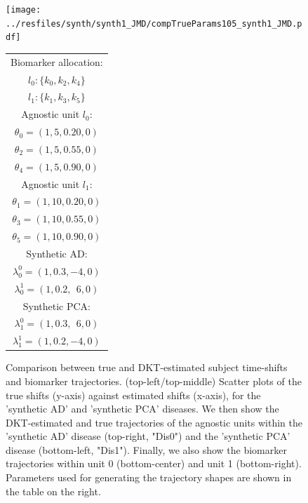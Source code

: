 \documentclass{llncs}
\begin{document}
\begin{figure}[htp]
\texttt{[image: ../resfiles/synth/synth1\_JMD/compTrueParams105\_synth1\_JMD.pdf]}
\begin{flushright}
\vspace{-16.0em}
\fontsize{5}{8.0}\selectfont
 \begin{tabular}{c}
 Biomarker allocation:\\
 $l_0:\{k_0, k_2, k_4\}$ \\
 $l_1: \{k_1, k_3, k_5\}$ \\
\hline
Agnostic unit $l_0$:\\
$\theta_0 = (1,5,0.20,0)$\\
$\theta_2 = (1,5,0.55,0)$\\
$\theta_4 = (1,5,0.90,0)$ \\
\hline
Agnostic unit $l_1$:\\
$\theta_1 = (1,10,0.20,0)$\\
$\theta_3 = (1,10,0.55,0)$\\
$\theta_5 = (1,10,0.90,0)$ \\
\hline  
Synthetic AD:\\
$\lambda_0^0 = (1, 0.3, -4, 0)$\\
$\lambda_0^1 = (1, 0.2,\ \ 6, 0)$ \\
\hline
Synthetic PCA:\\ 
$\lambda_1^0 = (1, 0.3,\ \ 6, 0)$\\
$\lambda_1^1 = (1, 0.2, -4, 0)$\\
\end{tabular}
\end{flushright}
\vspace{-1em}
\caption[DKT Simulation Results - Comparison between true and DKT-estimated biomarker trajectories and subject time-shifts.]{Comparison between true and DKT-estimated subject time-shifts and biomarker trajectories. (top-left/top-middle) Scatter plots of the true shifts (y-axis) against estimated shifts (x-axis), for the 'synthetic AD' and 'synthetic PCA' diseases. We then show the DKT-estimated and true trajectories of the agnostic units within the 'synthetic AD' disease (top-right, "Dis0") and the 'synthetic PCA' disease (bottom-left, "Dis1"). Finally, we also show the biomarker trajectories within unit 0 (bottom-center) and unit 1 (bottom-right). Parameters used for generating the trajectory shapes are shown in the table on the right.}
  \label{fig:dktSynthTrajCompTrue}
\end{figure}
\end{document}
